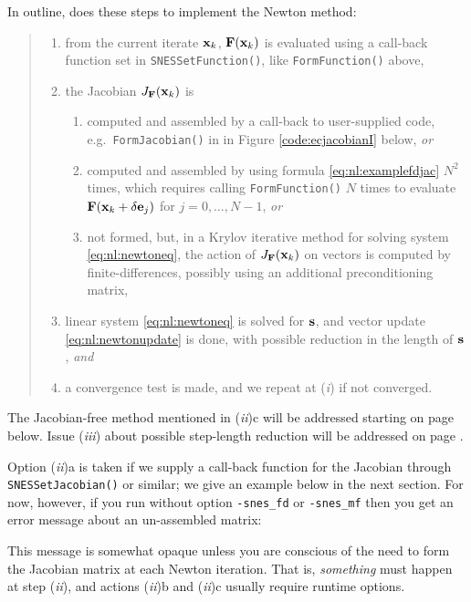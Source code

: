 In outline, \pSNES does these steps to implement the Newton method:
\begin{quote}
	\renewcommand{\labelenumi}{(\emph{\roman{enumi}})}
	\renewcommand{\labelenumii}{\emph{\alph{enumii}}.}
	\begin{enumerate}
	\item from the current iterate $\mathbf{x}_k$, $\mathbf{F}(\mathbf{x}_k)$ is evaluated using a call-back function set in \texttt{SNESSetFunction()}, like \texttt{FormFunction()} above,
	\item the Jacobian $J_{\mathbf{F}}(\mathbf{x}_k)$ is
	    \begin{enumerate}
	    \item computed and assembled by a call-back to user-supplied code, e.g.~\texttt{FormJacobian()} in in Figure \ref{code:ecjacobianI} below, \emph{or}
	    \item computed and assembled by using formula \eqref{eq:nl:examplefdjac} $N^2$ times, which requires calling \texttt{FormFunction()} $N$ times to evaluate $\mathbf{F}(\mathbf{x}_k+\delta \mathbf{e}_j)$ for $j=0,\dots,N-1$, \emph{or}
	    \item not formed, but, in a Krylov iterative method for solving system \eqref{eq:nl:newtoneq}, the action of $J_{\mathbf{F}}(\mathbf{x}_k)$ on vectors is computed by finite-differences, possibly using an additional preconditioning matrix,
        \end{enumerate}
	\item linear system \eqref{eq:nl:newtoneq} is solved for $\mathbf{s}$, and vector update \eqref{eq:nl:newtonupdate} is done, with possible reduction in the length of $\mathbf{s}$, \emph{and}
	\item a convergence test is made, and we repeat at (\emph{i}) if not converged.
	\end{enumerate}
\end{quote}

The Jacobian-free method mentioned in (\emph{ii})c will be addressed starting on page \pageref{sec:JFNK} below.  Issue (\emph{iii}) about possible step-length reduction will be addressed on page \pageref{sec:linesearch}.

Option (\emph{ii})a is taken if we supply a call-back function for the Jacobian through \texttt{SNESSetJacobian()} or similar; we give an example below in the next section.  For now, however, if you run without option \texttt{-snes\_fd} or \texttt{-snes\_mf} then you get an error message about an un-assembled matrix:
This message is somewhat opaque unless you are conscious of the need to form the Jacobian matrix at each Newton iteration.  That is, \emph{something} must happen at step (\emph{ii}), and actions (\emph{ii})b and (\emph{ii})c usually require runtime options.

